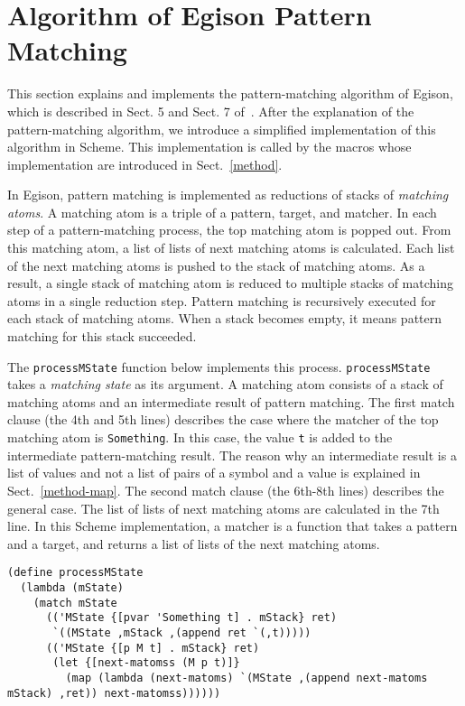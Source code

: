 \documentclass[acmlarge]{acmart}
\begin{document}
\section{Algorithm of Egison Pattern Matching}\label{algorithm}

This section explains and implements the pattern-matching algorithm of Egison, which is described in Sect. 5 and Sect. 7 of~\cite{egi2018aplas}.
After the explanation of the pattern-matching algorithm, we introduce a simplified implementation of this algorithm in Scheme.
This implementation is called by the macros whose implementation are introduced in Sect.~\ref{method}.

In Egison, pattern matching is implemented as reductions of stacks of \emph{matching atoms}.
A matching atom is a triple of a pattern, target, and matcher.
In each step of a pattern-matching process, the top matching atom is popped out.
From this matching atom, a list of lists of next matching atoms is calculated.
Each list of the next matching atoms is pushed to the stack of matching atoms.
As a result, a single stack of matching atom is reduced to multiple stacks of matching atoms in a single reduction step.
Pattern matching is recursively executed for each stack of matching atoms.
When a stack becomes empty, it means pattern matching for this stack succeeded.

The \texttt{processMState} function below implements this process.
\texttt{processMState} takes a \emph{matching state} as its argument.
A matching atom consists of a stack of matching atoms and an intermediate result of pattern matching.
The first match clause (the 4th and 5th lines) describes the case where the matcher of the top matching atom is \texttt{Something}.
In this case, the value \texttt{t} is added to the intermediate pattern-matching result.
The reason why an intermediate result is a list of values and not a list of pairs of a symbol and a value is explained in Sect.~\ref{method-map}.
The second match clause (the 6th-8th lines) describes the general case.
The list of lists of next matching atoms are calculated in the 7th line.
In this Scheme implementation, a matcher is a function that takes a pattern and a target, and returns a list of lists of the next matching atoms.

\begin{lstlisting}[language=egison]
(define processMState
  (lambda (mState)
    (match mState
      (('MState {[pvar 'Something t] . mStack} ret)
       `((MState ,mStack ,(append ret `(,t)))))
      (('MState {[p M t] . mStack} ret)
       (let {[next-matomss (M p t)]}
         (map (lambda (next-matoms) `(MState ,(append next-matoms mStack) ,ret)) next-matomss))))))
\end{lstlisting}
\end{document}
